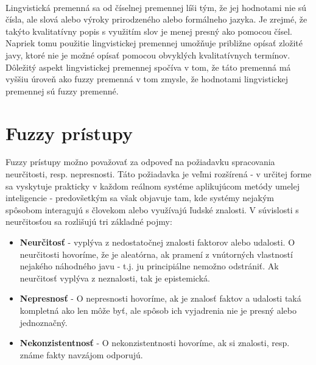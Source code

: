 \paragraph*{}
Lingvistická premenná sa od číselnej premennej líši tým, že jej hodnotami nie sú čísla, ale slová alebo výroky prirodzeného alebo formálneho jazyka. Je zrejmé, že takýto 
kvalitatívny popis s využitím slov je menej presný ako pomocou čísel. Napriek tomu použitie lingvistickej premennej umožňuje približne opísať zložité javy, ktoré nie je možné opísať pomocou obvyklých kvalitatívnych termínov. Dôležitý aspekt lingvistickej premennej spočíva v tom, že táto premenná má vyššiu úroveň ako fuzzy premenná v tom zmysle, že hodnotami lingvistickej premennej sú fuzzy premenné.  \cite{levashenkoProj}


























\pagebreak
\section{Fuzzy prístupy}

Fuzzy prístupy možno považovať za odpoveď na požiadavku spracovania neurčitosti, resp. nepresnosti. Táto požiadavka je veľmi rozšírená - v určitej forme sa vyskytuje prakticky v každom reálnom systéme aplikujúcom metódy umelej inteligencie - predovšetkým sa však objavuje tam, kde systémy nejakým spôsobom interagujú s človekom alebo využívajú ľudské znalosti. 
V súvislosti s neurčitosťou sa rozlišujú tri základné pojmy: \cite{gregorRef13, gregorUI}  %
\begin{itemize}
	\item \textbf{Neurčitosť} - vyplýva z nedostatočnej znalosti faktorov alebo udalosti. O neurčitosti hovoríme, že je aleatórna, ak pramení z vnútorných vlastností nejakého náhodného javu - t.j. ju principiálne nemožno odstrániť. Ak neurčitosť vyplýva z neznalosti, tak je epistemická. 
	\item \textbf{Nepresnosť} - O nepresnosti hovoríme, ak je znalosť faktov a udalosti taká kompletná ako len môže byť, ale spôsob ich vyjadrenia nie je presný alebo jednoznačný. 
	\item \textbf{Nekonzistentnosť} - O nekonzistentnosti hovoríme, ak si znalosti, resp. známe fakty navzájom odporujú. 
\end{itemize}

